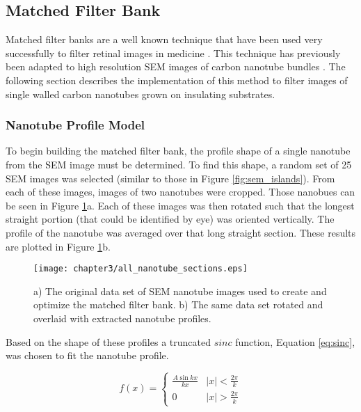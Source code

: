 \subsection{Matched Filter Bank}

Matched filter banks are a well known technique that have been used very successfully to filter retinal images in medicine \cite{Chaudhuri1989}. This technique has previously been adapted to high resolution SEM images of carbon nanotube bundles \cite{Guerrero2014}. The following section describes the implementation of this method to filter images of single walled carbon nanotubes grown on insulating substrates. 

\subsubsection{Nanotube Profile Model}

To begin building the matched filter bank, the profile shape of a single nanotube from the SEM image must be determined. To find this shape, a random set of 25 SEM images was selected (similar to those in Figure \ref{fig:sem_islands}). From each of these images, images of two nanotubes were cropped. Those nanobues can be seen in Figure \ref{fig:all_nanotube_sections}a. Each of these images was then rotated such that the longest straight portion (that could be identified by eye) was oriented vertically. The profile of the nanotube was averaged over that long straight section. These results are plotted in Figure \ref{fig:all_nanotube_sections}b.

\begin{figure}
	\centering
	\texttt{[image: chapter3/all\_nanotube\_sections.eps]}
	\caption{a) The original data set of SEM nanotube images used to create and optimize the matched filter bank. b) The same data set rotated and overlaid with extracted nanotube profiles.}
	\label{fig:all_nanotube_sections}
\end{figure}

Based on the shape of these profiles a truncated $sinc$ function, Equation \ref{eq:sinc}, was chosen to fit the nanotube profile.

\begin{equation} 
\label{eq:sinc}
    f(x) = \begin{cases} \frac{A\sin{kx}}{kx} & |x| < \frac{2\pi}{k} \\ 
                         0                    & |x| > \frac{2\pi}{k} 
           \end{cases}
\end{equation}


